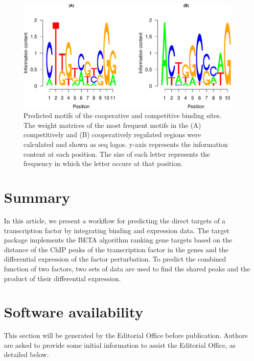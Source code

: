 \documentclass[9pt,a4paper,]{extarticle}
\begin{document}
\begin{figure}

{\centering \includegraphics[width=1\linewidth]{targetFlow_files/figure-latex/motifs-1} 

}

\caption{Predicted motifs of the cooperative and competitive binding sites. The weight matrices of the most frequent motifs in the (A) competitively and (B) cooperatively regulated regions were calculated and shown as seq logos. y-axis represents the information content at each position. The size of each letter represents the frequency in which the letter occure at that position.}\label{fig:motifs}
\end{figure}

\hypertarget{summary}{%
\section{Summary}\label{summary}}

In this article, we present a workflow for predicting the direct targets of a transcription factor by integrating binding and expression data. The target package implements the BETA algorithm ranking gene targets based on the distance of the ChIP peaks of the transcription factor in the genes and the differential expression of the factor perturbation. To predict the combined function of two factors, two sets of data are used to find the shared peaks and the product of their differential expression.

\hypertarget{software-availability}{%
\section{Software availability}\label{software-availability}}

This section will be generated by the Editorial Office before publication. Authors are asked to provide some initial information to assist the Editorial Office, as detailed below.
\end{document}
